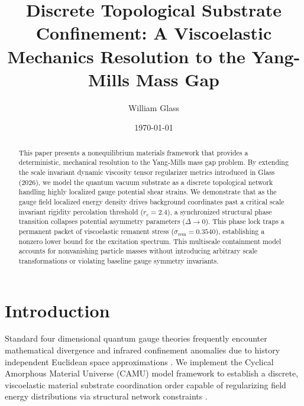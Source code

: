 \documentclass[reprint,amsmath,amssymb,aps,prd,nofootinbib]{revtex4-2}
\begin{document}

\title{Discrete Topological Substrate Confinement: A Viscoelastic Mechanics Resolution to the Yang-Mills Mass Gap}

\author{William Glass}

\date{\today}

\begin{abstract}
This paper presents a nonequilibrium materials framework that provides a deterministic, mechanical resolution to the Yang-Mills mass gap problem. By extending the scale invariant dynamic viscosity tensor regularizer metrics introduced in Glass (2026), we model the quantum vacuum substrate as a discrete topological network handling highly localized gauge potential shear strains. We demonstrate that as the gauge field localized energy density drives background coordinates past a critical scale invariant rigidity percolation threshold ($r_c = 2.4$), a synchronized structural phase transition collapses potential asymmetry parameters ($\Delta \to 0$). This phase lock traps a permanent packet of viscoelastic remanent stress ($\sigma_{\text{rem}} = 0.3540$), establishing a nonzero lower bound for the excitation spectrum. This multiscale containment model accounts for nonvanishing particle masses without introducing arbitrary scale transformations or violating baseline gauge symmetry invariants.
\end{abstract}

\maketitle

\section{Introduction}
Standard four dimensional quantum gauge theories frequently encounter mathematical divergence and infrared confinement anomalies due to history independent Euclidean space approximations \cite{anderson1972}. We implement the Cyclical Amorphous Material Universe (CAMU) model framework to establish a discrete, viscoelastic material substrate coordination order capable of regularizing field energy distributions via structural network constraints \cite{jaynes1957, martyushev2006}.
\end{document}
